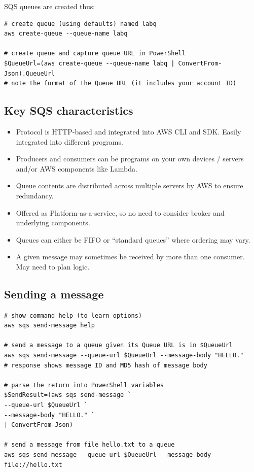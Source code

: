 \documentclass{pgnotes}
\begin{document}
SQS queues are created thus:
\begin{verbatim}
# create queue (using defaults) named labq
aws create-queue --queue-name labq

# create queue and capture queue URL in PowerShell
$QueueUrl=(aws create-queue --queue-name labq | ConvertFrom-Json).QueueUrl
# note the format of the Queue URL (it includes your account ID)
\end{verbatim}

\subsection{Key SQS characteristics}

\begin{itemize}
\item Protocol is HTTP-based and integrated into AWS CLI and SDK. Easily integrated into different programs.
\item Producers and consumers can be programs on your own devices / servers and/or AWS components like Lambda.
\item Queue contents are distributed across multiple servers by AWS to ensure redundancy.
\item Offered as Platform-as-a-service, so no need to consider broker and underlying components.
\item Queues can either be FIFO or ``standard queues'' where ordering may vary.
\item A given message may sometimes be received by more than one consumer. May need to plan logic.
\end{itemize}

\subsection{Sending a message}

\begin{verbatim}
# show command help (to learn options)
aws sqs send-message help

# send a message to a queue given its Queue URL is in $QueueUrl
aws sqs send-message --queue-url $QueueUrl --message-body "HELLO."
# response shows message ID and MD5 hash of message body

# parse the return into PowerShell variables
$SendResult=(aws sqs send-message `
--queue-url $QueueUrl `
--message-body "HELLO." `
| ConvertFrom-Json)

# send a message from file hello.txt to a queue
aws sqs send-message --queue-url $QueueUrl --message-body file://hello.txt
\end{verbatim}
\end{document}

